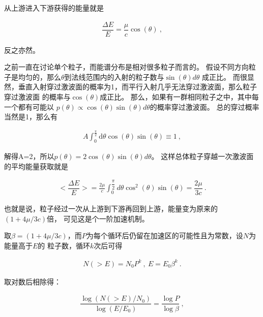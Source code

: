 从上游进入下游获得的能量就是

\begin{equation}
    \begin{aligned}
      \dfrac{\Delta E}{E} = \dfrac{\mu}{c} \cos (\theta)\ ,
    \end{aligned}
\end{equation}

反之亦然。

之前一直在讨论单个粒子，而能谱分布是相对很多粒子而言的。
假设不同方向粒子是均匀的，那么$\theta$到法线范围内的入射的粒子数与$\sin(\theta)d\theta$
成正比。
而很显然，垂直入射穿过激波面的概率为1，而平行入射几乎无法穿过激波面，那么粒子穿过激波面
的概率与$\cos(\theta)$成正比。
那么，如果有一群相同粒子之中，其中每一个都有可能以
$p(\theta)\propto \cos(\theta)\sin(\theta)d\theta$的概率穿过激波面。
总的穿过概率当然是1，那么有

\begin{equation}
    \begin{aligned}
      A \int_{0}^{\frac{\pi}{2}} \mathrm{d} \theta \cos
      (\theta) \sin (\theta) \equiv 1\ ,
    \end{aligned}
\end{equation}

解得A=2，所以$p(\theta)=2\cos(\theta)\sin(\theta)d\theta$。
这样总体粒子穿越一次激波面的平均能量获取就是

\begin{equation}
    \begin{aligned}
      <\dfrac{\Delta E}{E}>=\frac{2\mu}{c} \int_{0}^{\dfrac{\pi}{2}}
      d \theta \cos ^{2}(\theta) \sin (\theta) = \dfrac{2\mu}{3c} \ .
    \end{aligned}
\end{equation}

也就是说，粒子经过一次从上游到下游再回到上游，能量变为原来的$(1+4\mu/3c)$倍，
可见这是个一阶加速机制。

取$\beta=(1+4\mu/3c)$，而$P$为每个循环后仍留在加速区的可能性且为常数，设$N$为能量高于$E$的
粒子数，循环$k$次后可得

\begin{equation}
    \begin{aligned}
      N(>E)=N_{0} P^{k}\ ,\  E=E_{0} \beta^{k}\ .
    \end{aligned}
\end{equation}

取对数后相除得：

\begin{equation}
    \begin{aligned}
      \dfrac{\log \left(N(>E) / N_{0}\right)}{\log \left(E / E_{0}\right)}=
      \dfrac{\log P}{\log \beta} \ ,
    \end{aligned}
\end{equation}

